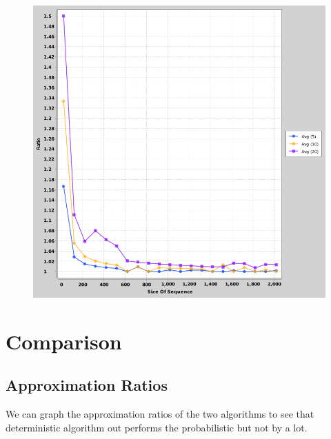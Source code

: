 \documentclass{article}
\begin{document}
			\begin{figure}[h]
				\vspace{3mm}
				\begin{center}
					\includegraphics[scale=0.4]{Prob.png}
				\end{center}
			\end{figure}
			
			\break
			
	\section{Comparison}
		\subsection{Approximation Ratios}
			We can graph the approximation ratios of the two algorithms to see that deterministic algorithm out performs the probabilistic but not by a lot.
			
\end{document}
